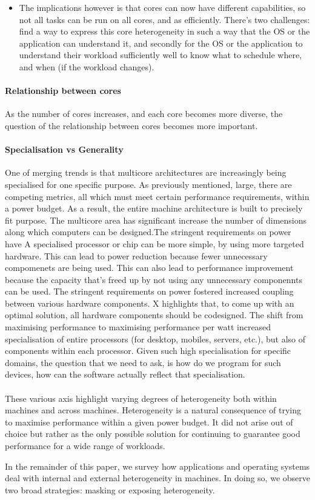 \begin{itemize}
\item The implications however is that cores can now have different
capabilities, so not all tasks can be run on all cores, and as efficiently.
There's two challenges: find a way to express this core heterogeneity in
such a way that the OS or the application can understand it, and secondly
for the OS or the application to understand their workload sufficiently well
to know what to schedule where, and when (if the workload changes).  
\end{itemize}

\paragraph{Relationship between cores } As the number of cores increases,
and each core becomes more diverse, the question of the relationship
between cores becomes more important. 
\paragraph{Specialisation vs Generality} One of merging trends
is that multicore architectures are increasingly being
specialised for one specific purpose. As previously mentioned,
large, there are competing metrics, all which must meet certain
performance requirements, within a power budget. As a result,
the entire machine architecture is built to precisely 
fit purpose. The multicore area has significant increase
the number of dimensions along which computers can be
designed.The stringent requirements on power have 
 A specialised processor or chip can be more simple, by using more targeted
hardware. This can lead to power reduction because fewer unnecessary
compomenets are being used. This can also lead to performance
improvement because the capacity that's freed up by not using any  unnecessary
componennts can be used. 
 The stringent requirements
on power fostered increased coupling between various hardware components.
X  highlights that, to come up with an optimal solution, all hardware components
should be codesigned. The shift from maximising performance to maximising performance
per watt increased specialisation of entire processors (for desktop, mobiles,
servers, etc.), but also of components within each processor.
Given such high specialisation for specific domains, the question that we need
to ask, is how do we program for such devices, how can the software actually 
reflect that specialisation. 

\paragraph{}  These various axis highlight varying degrees of heterogeneity both within
machines and across machines. Heterogeneity is a natural consequence of 
trying to maximise performance within a given power budget. It did not arise
out of choice but rather as the only possible solution for continuing to guarantee good performance for a wide range of workloads. 

In the remainder of this paper, we survey how applications and operating
systems deal with internal and external heterogeneity in machines. 
In doing so, we observe two broad strategies: masking or exposing heterogeneity. 

